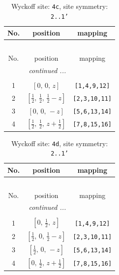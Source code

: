 \documentclass[fleqn,8pt]{jsarticle}
\begin{document}
\renewcommand{\arraystretch}{1.2}
\begin{longtable}{ccc}
\caption{Wyckoff site: {\tt 4c}, site symmetry: {\tt 2..1'}}
 \\
 \hline \hline
No. & position & mapping \\ \hline \endfirsthead

\multicolumn{2}{l}{\tablename\ \thetable{}} \\
 \hline \hline
No. & position & mapping \\ \hline \endhead

 \hline \hline
\multicolumn{2}{r}{\footnotesize\it continued ...} \\ \endfoot

 \hline \hline
\multicolumn{2}{r}{} \\ \endlastfoot

1 & $\left[ 0,\, 0,\, z \right]$ & {\tt [1,4,9,12]} \\ \hline
2 & $\left[ \frac{1}{2},\, \frac{1}{2},\, \frac{1}{2} - z \right]$ & {\tt [2,3,10,11]} \\ \hline
3 & $\left[ 0,\, 0,\, - z \right]$ & {\tt [5,6,13,14]} \\ \hline
4 & $\left[ \frac{1}{2},\, \frac{1}{2},\, z + \frac{1}{2} \right]$ & {\tt [7,8,15,16]} \\
\end{longtable}
\renewcommand{\arraystretch}{1.2}
\begin{longtable}{ccc}
\caption{Wyckoff site: {\tt 4d}, site symmetry: {\tt 2..1'}}
 \\
 \hline \hline
No. & position & mapping \\ \hline \endfirsthead

\multicolumn{2}{l}{\tablename\ \thetable{}} \\
 \hline \hline
No. & position & mapping \\ \hline \endhead

 \hline \hline
\multicolumn{2}{r}{\footnotesize\it continued ...} \\ \endfoot

 \hline \hline
\multicolumn{2}{r}{} \\ \endlastfoot

1 & $\left[ 0,\, \frac{1}{2},\, z \right]$ & {\tt [1,4,9,12]} \\ \hline
2 & $\left[ \frac{1}{2},\, 0,\, \frac{1}{2} - z \right]$ & {\tt [2,3,10,11]} \\ \hline
3 & $\left[ \frac{1}{2},\, 0,\, - z \right]$ & {\tt [5,6,13,14]} \\ \hline
4 & $\left[ 0,\, \frac{1}{2},\, z + \frac{1}{2} \right]$ & {\tt [7,8,15,16]} \\
\end{longtable}
\end{document}
